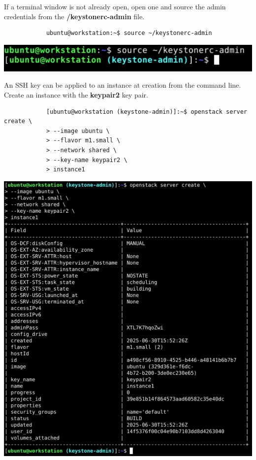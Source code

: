 \documentclass[letterpaper, 12pt]{article}
\begin{document}
\begin{enumerate}
    \begin{labstep}
        If a terminal window is not already open, open one and source the admin credentials from the \textbf{\texttildemid/keystonerc-admin} file.
        \begin{lstlisting}
            ubuntu@workstation:~$ source ~/keystonerc-admin
        \end{lstlisting}

        \begin{center}
            \includegraphics[width=\linewidth]{images/part4/step1.png}
        \end{center}
    \end{labstep}

    \begin{labstep}
        An SSH key can be applied to an instance at creation from the command line.
        Create an instance with the \textbf{keypair2} key pair.
        \begin{lstlisting}
            [ubuntu@workstation (keystone-admin)]:~$ openstack server create \
            > --image ubuntu \
            > --flavor m1.small \
            > --network shared \
            > --key-name keypair2 \
            > instance1
        \end{lstlisting}

        \begin{center}
            \includegraphics[width=\linewidth]{images/part4/step2.png}
        \end{center}
    \end{labstep}


\end{enumerate}
\end{document}
